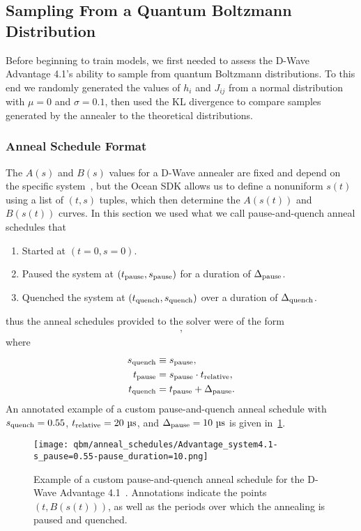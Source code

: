\subsection{Sampling From a Quantum Boltzmann Distribution}
Before beginning to train models, we first needed to assess the D-Wave Advantage 4.1's ability to sample from quantum Boltzmann distributions.
To this end we randomly generated the values of \( h_i \) and \( J_{ij} \) from a normal distribution with \( \mu = 0 \) and \( \sigma = 0.1 \), then used the KL divergence to compare samples generated by the annealer to the theoretical distributions.

\subsubsection{Anneal Schedule Format}
The \( A(s) \) and \( B(s) \) values for a D-Wave annealer are fixed and depend on the specific system~\cite{dwave_anneal_schedules}, but the Ocean SDK allows us to define a nonuniform \( s(t) \) using a list of \( (t, s) \) tuples, which then determine the \( A(s(t)) \) and \( B(s(t)) \) curves.
In this section we used what we call pause-and-quench anneal schedules that
\begin{enumerate}
    \item Started at \( (t = 0, s = 0) \).
    \item Paused the system at \( (t_{\text{pause}}, s_{\text{pause}}) \) for a duration of \( \Delta_{\text{pause}} \).
    \item Quenched the system at \( (t_{\text{quench}}, s_{\text{quench}}) \) over a duration of \( \Delta_{\text{quench}} \).
\end{enumerate}
thus the anneal schedules provided to the solver were of the form
\begin{align}
    [
        (0, 0),
        (\tpause, \spause),
        (\tquench, \squench),
        (\tquench + \Deltaquench, 1)
    ],
\end{align}
where
\begin{align}
\begin{split}
    s_{\text{quench}} &\equiv s_{\text{pause}}, \\
    t_{\text{pause}} &= s_{\text{pause}} \cdot t_{\text{relative}}, \\
    t_{\text{quench}} &= t_{\text{pause}} + \Delta_{\text{pause}}.
\end{split}
\end{align}
An annotated example of a custom pause-and-quench anneal schedule with \( s_{\text{quench}} = 0.55 \), \( t_{\text{relative}} = 20 \ \si{\micro\second} \), and \( \Deltapause = 10 \ \si{\micro\second} \) is given in~\cref{fig:anneal_schedule_annotated}.
\begin{figure}[!htb]
    \begin{center}
        \texttt{[image: qbm/anneal\_schedules/Advantage\_system4.1-s\_pause=0.55-pause\_duration=10.png]}
    \end{center}
    \caption{
        Example of a custom pause-and-quench anneal schedule for the D-Wave Advantage 4.1~\cite{dwave_anneal_schedules}.
        Annotations indicate the points \( (t, B(s(t))) \), as well as the periods over which the annealing is paused and quenched.
    }
    \label{fig:anneal_schedule_annotated}
\end{figure}

